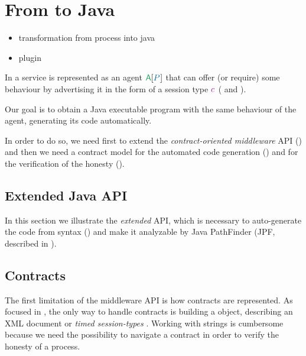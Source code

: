 \section{From \coco to Java}\label{sec:co2-to-java}

\begin{itemize}
\item transformation from \coco process into java 
\item \coco plugin
\end{itemize}


In \coco a service is represented as an agent $\sys{\pmv{A}}{\procP}$ that can offer (or require) some behaviour by advertising it in the form of a session type $\contrP$ ( and ).

Our goal is to obtain a Java executable program with the same behaviour of the \coco agent, generating its code automatically.

In order to do so, we need first to extend the \textit{contract-oriented middleware} API () and then we need a contract model for the automated code generation () and for the verification of the honesty ().



\subsection*{Extended \coco Java API}\label{sec:extended-api}
In this section we illustrate the \textit{extended} API, which is necessary to auto-generate the code from \coco syntax () and make it analyzable by Java PathFinder (JPF, described in ).


\subsection{Contracts}\label{sec:java-contracts-model}
The first limitation of the middleware API is how contracts are represented. As focused in , the only way to handle contracts is building a  object, describing an XML document or \textit{timed session-types} \cite{Bartoletti15forte}. Working with strings is cumbersome because we need the possibility to navigate a contract in order to verify the honesty of a process.

